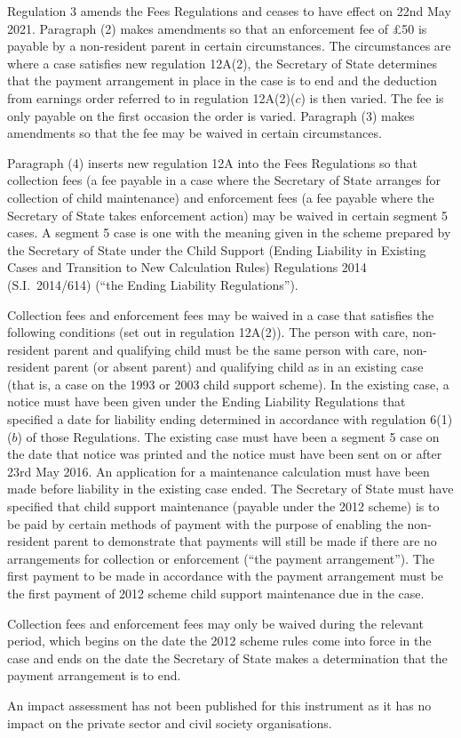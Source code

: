 \documentclass[12pt,a4paper]{article}
\begin{document}
Regulation 3 amends the Fees Regulations and ceases to have effect on 22nd May 2021. Paragraph (2) makes amendments so that an enforcement fee of £50 is payable by a non-resident parent in certain circumstances. The circumstances are where a case satisfies new regulation 12A(2), the Secretary of State determines that the payment arrangement in place in the case is to end and the deduction from earnings order referred to in regulation 12A(2)($c$) is then varied. The fee is only payable on the first occasion the order is varied. Paragraph (3) makes amendments so that the fee may be waived in certain circumstances.

Paragraph (4) inserts new regulation 12A into the Fees Regulations so that collection fees (a fee payable in a case where the Secretary of State arranges for collection of child maintenance) and enforcement fees (a fee payable where the Secretary of State takes enforcement action) may be waived in certain segment 5 cases. A segment 5 case is one with the meaning given in the scheme prepared by the Secretary of State under the Child Support (Ending Liability in Existing Cases and Transition to New Calculation Rules) Regulations 2014 (S.I.~2014/614) (“the Ending Liability Regulations”).

Collection fees and enforcement fees may be waived in a case that satisfies the following conditions (set out in regulation 12A(2)). The person with care, non-resident parent and qualifying child must be the same person with care, non-resident parent (or absent parent) and qualifying child as in an existing case (that is, a case on the 1993 or 2003 child support scheme). In the existing case, a notice must have been given under the Ending Liability Regulations that specified a date for liability ending determined in accordance with regulation 6(1)($b$) of those Regulations. The existing case must have been a segment 5 case on the date that notice was printed and the notice must have been sent on or after 23rd May 2016. An application for a maintenance calculation must have been made before liability in the existing case ended. The Secretary of State must have specified that child support maintenance (payable under the 2012 scheme) is to be paid by certain methods of payment with the purpose of enabling the non-resident parent to demonstrate that payments will still be made if there are no arrangements for collection or enforcement (“the payment arrangement”). The first payment to be made in accordance with the payment arrangement must be the first payment of 2012 scheme child support maintenance due in the case.

Collection fees and enforcement fees may only be waived during the relevant period, which begins on the date the 2012 scheme rules come into force in the case and ends on the date the Secretary of State makes a determination that the payment arrangement is to end.

An impact assessment has not been published for this instrument as it has no impact on the private sector and civil society organisations.
\end{document}
